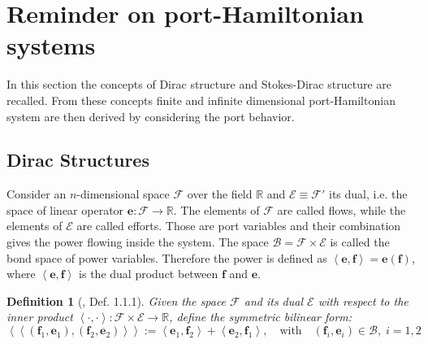 \documentclass[preprint,12pt]{elsarticle}
\newtheorem{definition}{Definition}
\begin{document}
{
\section{Reminder on port-Hamiltonian systems}
In this section the concepts of Dirac structure and Stokes-Dirac structure are recalled. From these concepts finite and infinite dimensional port-Hamiltonian system are then derived by considering the port behavior. 
\subsection{Dirac Structures}
Consider an $n$-dimensional space $\mathcal{F}$ over the field $\mathbb{R}$ and $\mathcal{E} \equiv \mathcal{F}'$ its dual, i.e. the space of linear operator $\bm{e} : \mathcal{F} \rightarrow \mathbb{R}$. The elements of $\mathcal{F}$ are called flows, while the elements of $\mathcal{E}$ are called efforts. Those are port variables and their combination gives the power flowing inside the system. The space $\mathcal{B} = \mathcal{F} \times \mathcal{E}$ is called the bond space of power variables. Therefore the power is defined as  $\left\langle \bm{e}, \bm{f} \right\rangle = \bm{e}(\bm{f})$, where $\left\langle \bm{e} , \bm{f} \right\rangle$ is the dual product between $\bm{f}$ and $\bm{e}$.
\begin{definition}[\cite{CourantDiracStructure}, Def. 1.1.1]
	Given the space $\mathcal{F}$ and its dual $\mathcal{E}$ with respect to the inner product $\left\langle \cdot , \cdot \right\rangle : \mathcal{F} \times \mathcal{E} \rightarrow \mathbb{R}$, define the symmetric bilinear form:
	\begin{equation}
	\left\langle \left\langle (\bm{f}_1, \bm{e}_1), (\bm{f}_2, \bm{e}_2) \right\rangle \right\rangle := \left\langle \bm{e}_1, \bm{f}_2 \right\rangle +  \left\langle \bm{e}_2, \bm{f}_1 \right\rangle, \quad \text{with} \quad (\bm{f}_i, \bm{e}_i) \in \mathcal{B}, \; i = 1, 2
	\end{equation}
	

\end{definition}}
\end{document}
